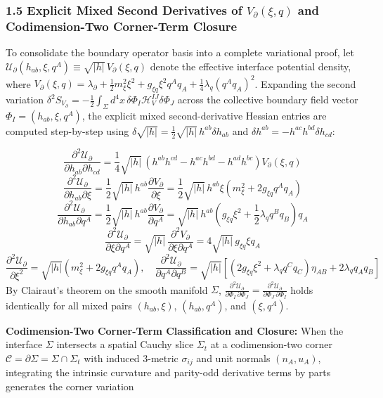 \documentclass[aps,prd,onecolumn,superscriptaddress,nofootinbib,longbibliography,10pt]{revtex4-2}
\begin{document}
  
\subsubsection*{1.5 Explicit Mixed Second Derivatives of \(V_\partial(\xi,q)\) and Codimension-Two Corner-Term Closure}

  To consolidate the boundary operator basis into a complete variational proof, let \(\mathcal{U}_\partial(h_{ab}, \xi, q^A) \equiv \sqrt{|h|}\, V_\partial(\xi, q)\) denote the effective interface potential density, where \(V_\partial(\xi, q) = \lambda_\partial + \frac{1}{2}m_\xi^2 \xi^2 + g_{\xi q}\xi^2 q^A q_A + \frac{1}{4}\lambda_q (q^A q_A)^2\). Expanding the second variation \(\delta^2 S_{V_\partial} = -\frac{1}{2}\int_\Sigma d^4x\, \delta\Phi_I \mathcal{H}_V^{IJ} \delta\Phi_J\) across the collective boundary field vector \(\Phi_I = (h_{ab}, \xi, q^A)\), the explicit mixed second-derivative Hessian entries are computed step-by-step using \(\delta\sqrt{|h|} = \frac{1}{2}\sqrt{|h|}\,h^{ab}\delta h_{ab}\) and \(\delta h^{ab} = -h^{ac}h^{bd}\delta h_{cd}\):


  \[ \frac{\partial^2 \mathcal{U}_\partial}{\partial h_{ab}\partial h_{cd}} = \frac{1}{4}\sqrt{|h|}\,(h^{ab}h^{cd} - h^{ac}h^{bd} - h^{ad}h^{bc})V_\partial(\xi, q) \]
  \[ \frac{\partial^2 \mathcal{U}_\partial}{\partial h_{ab}\partial\xi} = \frac{1}{2}\sqrt{|h|}\,h^{ab}\frac{\partial V_\partial}{\partial\xi} = \frac{1}{2}\sqrt{|h|}\,h^{ab}\xi\left(m_\xi^2 + 2g_{\xi q} q^A q_A\right) \]
  \[ \frac{\partial^2 \mathcal{U}_\partial}{\partial h_{ab}\partial q^A} = \frac{1}{2}\sqrt{|h|}\,h^{ab}\frac{\partial V_\partial}{\partial q^A} = \sqrt{|h|}\,h^{ab}\left(g_{\xi q}\xi^2 + \frac{1}{2}\lambda_q q^B q_B\right)q_A \]
  \[ \frac{\partial^2 \mathcal{U}_\partial}{\partial\xi\partial q^A} = \sqrt{|h|}\,\frac{\partial^2 V_\partial}{\partial\xi\partial q^A} = 4\sqrt{|h|}\,g_{\xi q}\xi q_A \]
  \[ \frac{\partial^2 \mathcal{U}_\partial}{\partial\xi^2} = \sqrt{|h|}\left(m_\xi^2 + 2g_{\xi q} q^A q_A\right), \quad \frac{\partial^2 \mathcal{U}_\partial}{\partial q^A \partial q^B} = \sqrt{|h|}\left[ (2g_{\xi q}\xi^2 + \lambda_q q^C q_C)\eta_{AB} + 2\lambda_q q_A q_B \right] \]
  By Clairaut's theorem on the smooth manifold \(\Sigma\), \(\displaystyle \frac{\partial^{2}\mathcal{U}_{\partial}}{\partial\Phi_{I}\,\partial\Phi_{J}} = \frac{\partial^{2}\mathcal{U}_{\partial}}{\partial\Phi_{J}\,\partial\Phi_{I}}\) holds identically for all mixed pairs \((h_{ab}, \xi)\), \((h_{ab}, q^A)\), and \((\xi, q^A)\).


  \textbf{Codimension-Two Corner-Term Classification and Closure:} When the interface \(\Sigma\) intersects a spatial Cauchy slice \(\Sigma_t\) at a codimension-two corner \(\mathcal{C} = \partial\Sigma = \Sigma \cap \Sigma_t\) with induced 3-metric \(\sigma_{ij}\) and unit normals \((n_A, u_A)\), integrating the intrinsic curvature and parity-odd derivative terms by parts generates the corner variation
\end{document}
